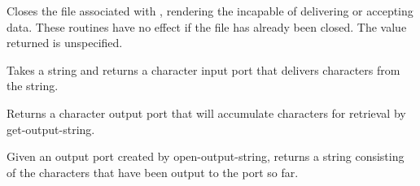 \begin{entry}{%
}

Closes the file associated with , rendering the 
incapable of delivering or accepting data.  
These routines have no effect if the file has already been closed.
The value returned is unspecified.



\end{entry}


\begin{entry}{%
}

Takes a string and returns a character input port that delivers
characters from the string.


\end{entry}

\begin{entry}{%
}

Returns a character output port that will accumulate characters for
retrieval by {\cf get-output-string}.

\end{entry}

\begin{entry}{%
}

Given an output port created by {\cf open-output-string}, returns a
string consisting of the characters that have been output to the port
so far.
\end{entry}


